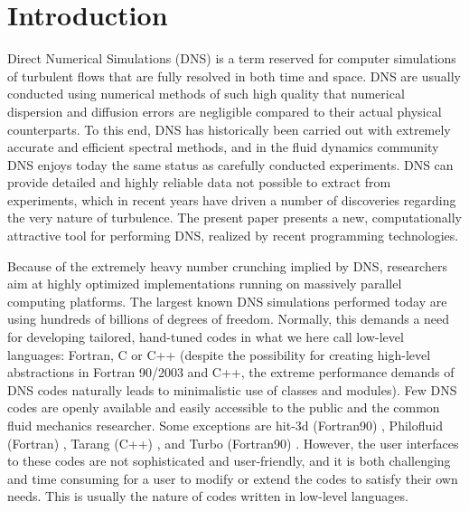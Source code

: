 \documentclass[11pt, oneside]{article}
\begin{document}
\section{Introduction}
Direct Numerical Simulations (DNS) is a term reserved for computer simulations of turbulent flows that are
fully resolved in both time and space. DNS are usually conducted using numerical methods of such high
quality that numerical dispersion and diffusion errors are negligible compared to their actual physical
counterparts. To this end, DNS has historically been carried out with extremely accurate and efficient
spectral methods, and in the fluid dynamics community DNS enjoys  today the same status as carefully
conducted experiments. DNS can provide detailed and highly reliable data not possible to extract from
experiments, which in recent years have driven a number of discoveries regarding the very nature of
turbulence. The present paper presents a new, computationally attractive tool for performing DNS, realized
by recent programming technologies.

Because of the extremely heavy number crunching implied by DNS,
researchers aim at highly optimized implementations running on
massively parallel computing platforms. The largest known DNS
simulations performed today are using hundreds of billions of degrees
of freedom. Normally, this demands a need for developing tailored, hand-tuned
codes in what we here call low-level languages: Fortran, C or C++ (despite
the possibility for creating high-level abstractions in Fortran 90/2003 and
C++, the extreme performance demands of DNS codes naturally leads to
minimalistic use of classes and modules). Few
DNS codes are openly available and easily accessible to the public and
the common fluid mechanics researcher. Some exceptions are hit-3d
(Fortran90) \cite{hit-3d}, Philofluid (Fortran) \cite{philofluid},
Tarang (C++) \cite{tarang}, and Turbo (Fortran90)
\cite{turbo}. However, the user interfaces to these codes are not sophisticated and user-friendly,
and it is both challenging and time consuming for a user to
modify or extend the codes to satisfy their own needs. This is usually
the nature of codes written in low-level languages.
\end{document}

